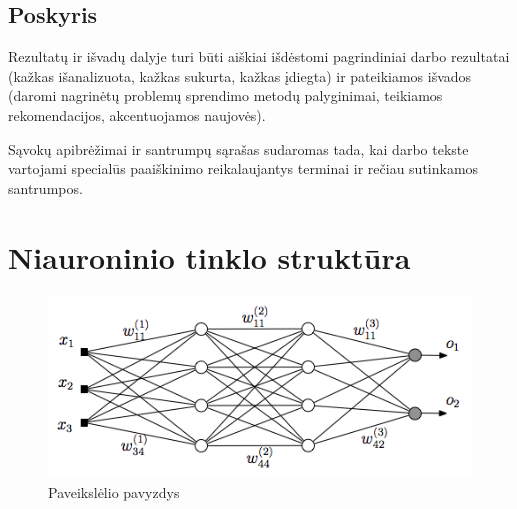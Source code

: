 \documentclass{VUMIFPSkursinis}
\begin{document}
\subsection{Poskyris}

Rezultatų ir išvadų dalyje turi būti aiškiai išdėstomi pagrindiniai darbo
rezultatai (kažkas išanalizuota, kažkas sukurta, kažkas įdiegta) ir pateikiamos
išvados (daromi nagrinėtų problemų sprendimo metodų palyginimai, teikiamos
rekomendacijos, akcentuojamos naujovės).

\printbibliography  %

Sąvokų apibrėžimai ir santrumpų sąrašas sudaromas tada, kai darbo tekste
vartojami specialūs paaiškinimo reikalaujantys terminai ir rečiau sutinkamos
santrumpos.

\appendix  %

\section{Niauroninio tinklo struktūra}
\begin{figure}[H]
    \centering
    \includegraphics[scale=0.5]{img/MLP}
    \caption{Paveikslėlio pavyzdys}
    \label{img:mlp}
\end{figure}
\end{document}
